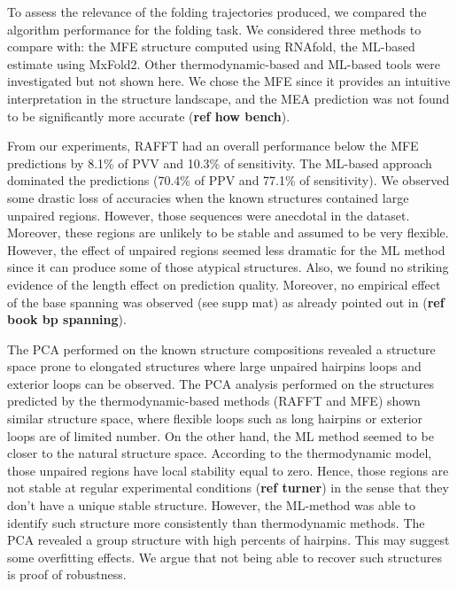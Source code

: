 \documentclass[a4paper,12pt]{article}
\begin{document}
{{To assess the relevance of the folding trajectories produced, we compared the
algorithm performance for the folding task. We considered three methods to
compare with: the MFE structure computed using RNAfold, the ML-based estimate
using MxFold2. Other thermodynamic-based and ML-based tools were investigated
but not shown here. We chose the MFE since it provides an intuitive
interpretation in the structure landscape, and the MEA prediction was not found
to be significantly more accurate (\textbf{ref how bench}).

From our experiments, RAFFT had an overall performance below the MFE predictions
by 8.1\% of PVV and 10.3\% of sensitivity. The ML-based approach dominated the
predictions (70.4\% of PPV and 77.1\% of sensitivity). We observed some drastic
loss of accuracies when the known structures contained large unpaired regions.
However, those sequences were anecdotal in the dataset. Moreover, these regions
are unlikely to be stable and assumed to be very flexible. However, the effect
of unpaired regions seemed less dramatic for the ML method since it can produce
some of those atypical structures. Also, we found no striking evidence of the
length effect on prediction quality. Moreover, no empirical effect of the base
spanning was observed (see supp mat) as already pointed out in (\textbf{ref book bp
spanning}).

The PCA performed on the known structure compositions revealed a structure space
prone to elongated structures where large unpaired hairpins loops and exterior
loops can be observed. The PCA analysis performed on the structures predicted by
the thermodynamic-based methods (RAFFT and MFE) shown similar structure space,
where flexible loops such as long hairpins or exterior loops are of limited
number. On the other hand, the ML method seemed to be closer to the natural
structure space. According to the thermodynamic model, those unpaired regions
have local stability equal to zero. Hence, those regions are not stable at
regular experimental conditions (\textbf{ref turner}) in the sense that they don't have
a unique stable structure. However, the ML-method was able to identify such
structure more consistently than thermodynamic methods. The PCA revealed a group
structure with high percents of hairpins. This may suggest some overfitting
effects. We argue that not being able to recover such structures is proof of
robustness.

}}
\end{document}
